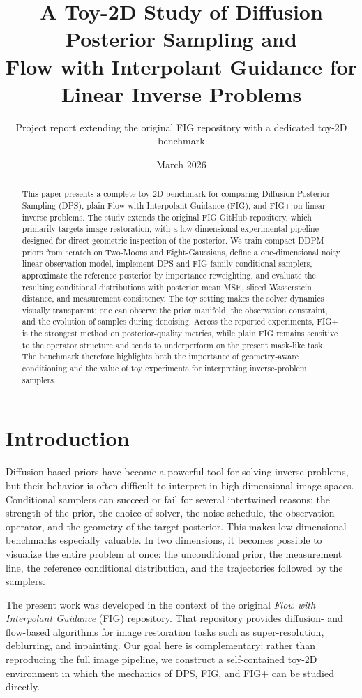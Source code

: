 \documentclass[10pt,twocolumn]{article}
\title{\bf A Toy-2D Study of Diffusion Posterior Sampling and\\Flow with Interpolant Guidance for Linear Inverse Problems}
\author{Project report extending the original FIG repository with a dedicated toy-2D benchmark}
\date{March 2026}
\begin{document}
\maketitle

\begin{abstract}
This paper presents a complete toy-2D benchmark for comparing Diffusion Posterior Sampling (DPS), plain Flow with Interpolant Guidance (FIG), and FIG+ on linear inverse problems. The study extends the original FIG GitHub repository, which primarily targets image restoration, with a low-dimensional experimental pipeline designed for direct geometric inspection of the posterior. We train compact DDPM priors from scratch on Two-Moons and Eight-Gaussians, define a one-dimensional noisy linear observation model, implement DPS and FIG-family conditional samplers, approximate the reference posterior by importance reweighting, and evaluate the resulting conditional distributions with posterior mean MSE, sliced Wasserstein distance, and measurement consistency. The toy setting makes the solver dynamics visually transparent: one can observe the prior manifold, the observation constraint, and the evolution of samples during denoising. Across the reported experiments, FIG+ is the strongest method on posterior-quality metrics, while plain FIG remains sensitive to the operator structure and tends to underperform on the present mask-like task. The benchmark therefore highlights both the importance of geometry-aware conditioning and the value of toy experiments for interpreting inverse-problem samplers.
\end{abstract}

\section{Introduction}

Diffusion-based priors have become a powerful tool for solving inverse problems, but their behavior is often difficult to interpret in high-dimensional image spaces. Conditional samplers can succeed or fail for several intertwined reasons: the strength of the prior, the choice of solver, the noise schedule, the observation operator, and the geometry of the target posterior. This makes low-dimensional benchmarks especially valuable. In two dimensions, it becomes possible to visualize the entire problem at once: the unconditional prior, the measurement line, the reference conditional distribution, and the trajectories followed by the samplers.

The present work was developed in the context of the original \textit{Flow with Interpolant Guidance} (FIG) repository. That repository provides diffusion- and flow-based algorithms for image restoration tasks such as super-resolution, deblurring, and inpainting. Our goal here is complementary: rather than reproducing the full image pipeline, we construct a self-contained toy-2D environment in which the mechanics of DPS, FIG, and FIG+ can be studied directly.
\end{document}
